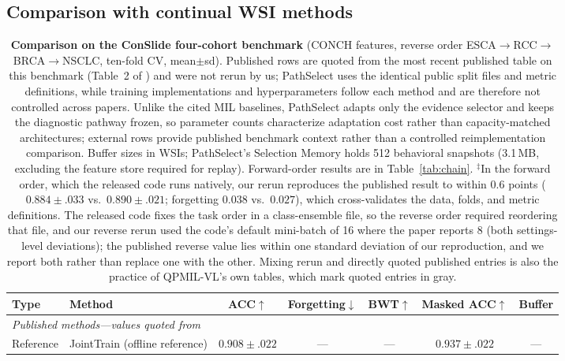 \documentclass{article}
\begin{document}
\subsection{Comparison with continual WSI methods}
\label{ssec:sota}

\begin{table}[t]
\centering\footnotesize
\caption{\textbf{Comparison on the ConSlide four-cohort benchmark} \cite{huang2023conslide} (CONCH features, reverse order ESCA$\rightarrow$RCC$\rightarrow$BRCA$\rightarrow$NSCLC, ten-fold CV, mean$\pm$sd). Published rows are quoted from the most recent published table on this benchmark (Table~2 of \cite{gou2025qpmil}) and were not rerun by us; PathSelect uses the identical public split files and metric definitions, while training implementations and hyperparameters follow each method and are therefore not controlled across papers. Unlike the cited MIL baselines, PathSelect adapts only the evidence selector and keeps the diagnostic pathway frozen, so parameter counts characterize adaptation cost rather than capacity-matched architectures; external rows provide published benchmark context rather than a controlled reimplementation comparison. Buffer sizes in WSIs; PathSelect's Selection Memory holds 512 behavioral snapshots (3.1\,MB, excluding the feature store required for replay). Forward-order results are in Table~\ref{tab:chain}. $^\ddagger$In the forward order, which the released code runs natively, our rerun reproduces the published result to within $0.6$ points ($0.884{\pm}.033$ vs.\ $0.890{\pm}.021$; forgetting $0.038$ vs.\ $0.027$), which cross-validates the data, folds, and metric definitions. The released code fixes the task order in a class-ensemble file, so the reverse order required reordering that file, and our reverse rerun used the code's default mini-batch of 16 where the paper reports 8 (both settings-level deviations); the published reverse value lies within one standard deviation of our reproduction, and we report both rather than replace one with the other. Mixing rerun and directly quoted published entries is also the practice of QPMIL-VL's own tables, which mark quoted entries in gray.}
\label{tab:sota}
\begin{tabular}{llccccc}
\toprule
Type & Method & ACC$\uparrow$ & Forgetting$\downarrow$ & BWT$\uparrow$ & Masked ACC$\uparrow$ & Buffer \\
\midrule
\multicolumn{7}{l}{\emph{Published methods---values quoted from \cite{gou2025qpmil}}} \\
Reference & JointTrain (offline reference) & $0.908{\pm}.022$ & --- & --- & $0.937{\pm}.022$ & --- \\

\end{tabular}
\end{table}
\end{document}
